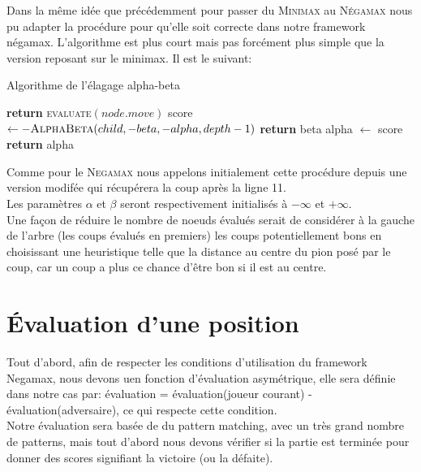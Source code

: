 \documentclass{article}
\begin{document}
\pagebreak
Dans la même idée que précédemment pour passer du \textsc{Minimax} au \textsc{Négamax} nous pu adapter la procédure pour qu'elle soit correcte dans
notre framework négamax. L'algorithme est plus court mais pas forcément plus simple que la version reposant sur le minimax. Il est le suivant:\\
\begin{algorithm}
\caption{Algorithme de l'élagage alpha-beta}\label{negamax}
\begin{algorithmic}[1]
		\State \textbf{return} \textsc{evaluate}$(node.move)$
	\EndIf
		\State score $\gets -\textsc{AlphaBeta}(child,-beta, -alpha, depth -1)$
			\State \textbf{return} beta
		\EndIf
			\State alpha $\gets$ score
		\EndIf
	\EndFor
	\State \textbf{return} alpha
\EndProcedure
\end{algorithmic}
\end{algorithm}

Comme pour le \textsc{Negamax} nous appelons initialement cette procédure depuis une version modifée qui récupérera la coup après la ligne 11.\\
Les paramètres $\alpha$ et $\beta$ seront respectivement initialisés à $-\infty$ et $+\infty$.\\
Une façon de réduire le nombre de noeuds évalués serait de considérer à la gauche de l'arbre (les coups évalués en premiers) les coups potentiellement
bons en choisissant une heuristique telle que la distance au centre du pion posé par le coup, car un coup a plus ce chance d'être bon si il est au centre.

\pagebreak
\section{Évaluation d'une position}

Tout d'abord, afin de respecter les conditions d'utilisation du framework Negamax, nous devons uen fonction d'évaluation asymétrique, elle sera définie
dans notre cas par: évaluation = évaluation(joueur courant) - évaluation(adversaire), ce qui respecte cette condition.\\
Notre évaluation sera basée de du pattern matching, avec un très grand nombre de patterns, mais tout d'abord nous devons vérifier si la partie est terminée
pour donner des scores signifiant la victoire (ou la défaite).
\end{document}
